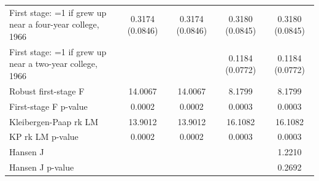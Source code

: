 \begin{table}
\begin{tabular}{lcccc}
First stage: =1 if grew up near a four-year college, 1966 & 0.3174 (0.0846) & 0.3174 (0.0846) & 0.3180 (0.0845) & 0.3180 (0.0845) \\
First stage: =1 if grew up near a two-year college, 1966 &  &  & 0.1184 (0.0772) & 0.1184 (0.0772) \\
Robust first-stage F & 14.0067 & 14.0067 & 8.1799 & 8.1799 \\
First-stage F p-value & 0.0002 & 0.0002 & 0.0003 & 0.0003 \\
Kleibergen-Paap rk LM & 13.9012 & 13.9012 & 16.1082 & 16.1082 \\
KP rk LM p-value & 0.0002 & 0.0002 & 0.0003 & 0.0003 \\
Hansen J &  &  &  & 1.2210 \\
Hansen J p-value &  &  &  & 0.2692 \\
\bottomrule
\end{tabular}
\end{table}
